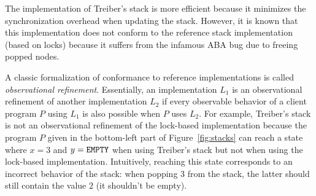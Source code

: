 The implementation of Treiber's stack is more efficient because it minimizes the synchronization overhead when updating the stack. However, it is known that this implementation does not conform to the reference stack implementation (based on locks) because it suffers from the infamous ABA bug due to freeing popped nodes.

A classic formalization of conformance to reference implementations is called \emph{observational refinement}. Essentially, an implementation $L_1$ is an observational refinement of another implementation $L_2$ if every observable behavior of a client program $P$ using $L_1$ is also possible when $P$ uses $L_2$. For example, Treiber's stack is not an observational refinement of the lock-based implementation because the program $P$ given in the bottom-left part of Figure~\ref{fig:stacks} can reach a state where $x=3$ and $y={\tt EMPTY}$ when using Treiber's stack but not when using the lock-based implementation. Intuitively, reaching this state corresponds to an incorrect behavior of the stack: when popping $3$ from the stack, the latter should still contain the value $2$ (it shouldn't be empty).












